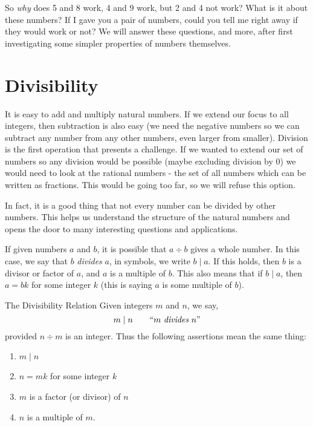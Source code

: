 \documentclass[12pt]{article}
\begin{document}
So {\em why} does 5 and 8 work, 4 and 9 work, but 2 and 4 not work?  What is it about these numbers?  If I gave you a pair of numbers, could you tell me right away if they would work or not?  We will answer these questions, and more, after first investigating some simpler properties of numbers themselves.

\section{Divisibility}

It is easy to add and multiply natural numbers.  If we extend our focus to all integers, then subtraction is also easy (we need the negative numbers so we can subtract any number from any other numbers, even larger from smaller).  Division is the first operation that presents a challenge.  If we wanted to extend our set of numbers so any division would be possible (maybe excluding division by 0) we would need to look at the rational numbers - the set of all numbers which can be written as fractions.  This would be going too far, so we will refuse this option.

In fact, it is a good thing that not every number can be divided by other numbers.  This helps us understand the structure of the natural numbers and opens the door to many interesting questions and applications.

If given numbers $a$ and $b$, it is possible that $a \div b$ gives a whole number.  In this case, we say that $b$ {\em divides} $a$, in symbols, we write $b \mid a$.  If this holds, then $b$ is a divisor or factor of $a$, and $a$ is a multiple of $b$.  This also means that if $b \mid a$, then $a = bk$ for some integer $k$ (this is saying $a$ is some multiple of $b$).  

\begin{defbox}{The Divisibility Relation}
	Given integers $m$ and $n$, we say,
	\[m \mid n \qquad \mbox{``$m$ {\em divides} $n$''}\]
	provided $n \div m$ is an integer.  Thus the following assertions mean the same thing:
	\begin{enumerate}
		\item $m \mid n$
		\item $n = mk$ for some integer $k$
		\item $m$ is a factor (or divisor) of $n$
		\item $n$ is a multiple of $m$.
	\end{enumerate}
\end{defbox}  
\end{document}
